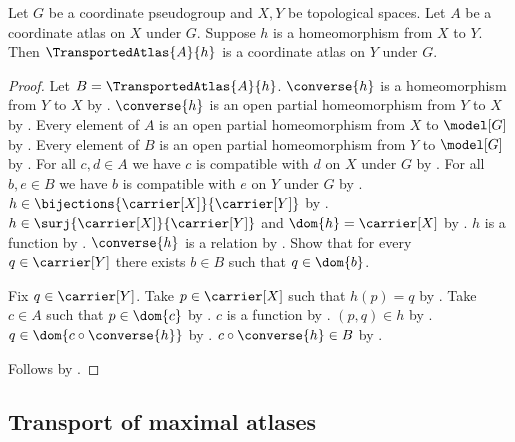 \begin{classification}\label{transported_atlas_is_atlas}
    Let $G$ be a coordinate pseudogroup and $X,Y$ be topological spaces.
    Let $A$ be a coordinate atlas on $X$ under $G$.
    Suppose $h$ is a homeomorphism from $X$ to $Y$.
    Then $\TransportedAtlas{A}{h}$ is a coordinate atlas on $Y$ under $G$.
\end{classification}
\begin{proof}
    Let $B=\TransportedAtlas{A}{h}$.
    $\converse{h}$ is a homeomorphism from $Y$ to $X$ by .
    $\converse{h}$ is an open partial homeomorphism from $Y$ to $X$ by
        .
    Every element of $A$ is an open partial homeomorphism from $X$ to $\model[G]$ by
        .
    Every element of $B$ is an open partial homeomorphism from $Y$ to $\model[G]$ by
        .
    For all $c,d\in A$ we have $c$ is compatible with $d$ on $X$ under $G$ by
        .
    For all $b,e\in B$ we have $b$ is compatible with $e$ on $Y$ under $G$ by
        .
    $h\in\bijections{\carrier[X]}{\carrier[Y]}$ by .
    $h\in\surj{\carrier[X]}{\carrier[Y]}$ and $\dom{h}=\carrier[X]$ by
        .
    $h$ is a function by .
    $\converse{h}$ is a relation by .
    Show that for every $q\in\carrier[Y]$ there exists $b\in B$ such that $q\in\dom{b}$.
    \begin{subproof}
        Fix $q\in\carrier[Y]$.
        Take $p\in\carrier[X]$ such that $h(p)=q$ by .
        Take $c\in A$ such that $p\in\dom{c}$ by .
        $c$ is a function by .
        $(p,q)\in h$ by .
        $q\in\dom{c\circ\converse{h}}$ by
            .
        $c\circ\converse{h}\in B$ by .
    \end{subproof}
    Follows by .
\end{proof}

\subsection{Transport of maximal atlases}

